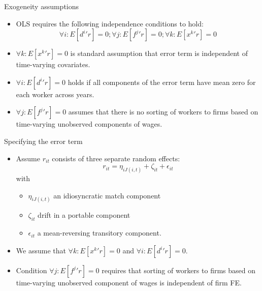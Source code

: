 \documentclass[notes=show]{beamer}
\begin{document}
\begin{frame}{Exogeneity assumptions}
\begin{itemize}
\item OLS requires the following independence conditions to hold:
\begin{equation} \label{eq_exogeneity}
	\forall i: E[d^{i}{'}r]=0 ; \forall j: E[f^{j}{'}r]=0 ; \forall k: E[x^{k}{'}r]=0 
\end{equation}
\item $\forall k: E[x^{k}{'}r]=0$ is standard assumption that error term is independent of time-varying covariates. \medskip
\item $\forall i: E[d^{i}{'}r]=0$ holds if all components of the error term have mean zero for each worker across years. \medskip
\item $\forall j: E[f^{j}{'}r]=0$ assumes that there is no sorting of workers to firms based on time-varying unobserved components of wages.
\end{itemize}
\end{frame}

\begin{frame}{Specifying the error term}
\begin{itemize}
\item Assume $r_{it}$ consists of three separate random effects:
\begin{equation*}
	r_{it} = \eta_{iJ(i,t)} + \zeta_{it} + \epsilon_{it}
\end{equation*}
with
\begin{itemize}
    \item $\eta_{iJ(i,t)}$ an idiosyncratic match component \smallskip
    \item $\zeta_{it}$ drift in a portable component \smallskip
    \item $\epsilon_{it}$ a mean-reversing transitory component. \smallskip
\end{itemize}
\item We assume that $\forall k: E[x^{k}{'}r]=0$ and $\forall i: E[d^{i}{'}r]=0$. \medskip
\item Condition $\forall j: E[f^{j}{'}r]=0$ requires that sorting of workers to firms based on time-varying unobserved component of wages is independent of firm FE.
\end{itemize}
\end{frame}
\end{document}
